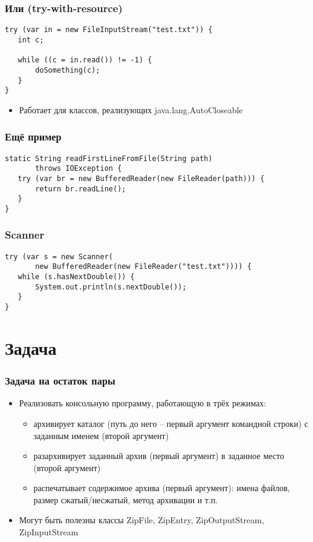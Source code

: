 \documentclass[xetex,mathserif,serif]{beamer}
\begin{document}
	\begin{frame}[fragile]
		\frametitle{Или (try-with-resource)}
		\begin{verbatim}
try (var in = new FileInputStream("test.txt")) {
   int c;

   while ((c = in.read()) != -1) {
       doSomething(c);
   }
}
		\end{verbatim}
		\begin{itemize}
			\item Работает для классов, реализующих java.lang.AutoCloseable
		\end{itemize}
	\end{frame}

	\begin{frame}[fragile]
		\frametitle{Ещё пример}
		\begin{verbatim}
static String readFirstLineFromFile(String path)
       throws IOException {
   try (var br = new BufferedReader(new FileReader(path))) {
       return br.readLine();
   }
}
		\end{verbatim}
	\end{frame}

	\begin{frame}[fragile]
		\frametitle{Scanner}
		\begin{verbatim}
try (var s = new Scanner(
       new BufferedReader(new FileReader("test.txt")))) {
   while (s.hasNextDouble()) {
       System.out.println(s.nextDouble());
   }
}
		\end{verbatim}
	\end{frame}

	\section{Задача}

	\begin{frame}
		\frametitle{Задача на остаток пары}
		\begin{itemize}
			\item Реализовать консольную программу, работающую в трёх режимах:
			\begin{itemize}
				\item архивирует каталог (путь до него -- первый аргумент командной строки) с заданным именем (второй аргумент)
				\item разархивирует заданный архив (первый аргумент) в заданное место (второй аргумент)
				\item распечатывает содержимое архива (первый аргумент): имена файлов, размер сжатый/несжатый, метод архивации и т.п.
			\end{itemize}
			\item Могут быть полезны классы ZipFile, ZipEntry, ZipOutputStream, ZipInputStream
		\end{itemize}
	\end{frame}
\end{document}
